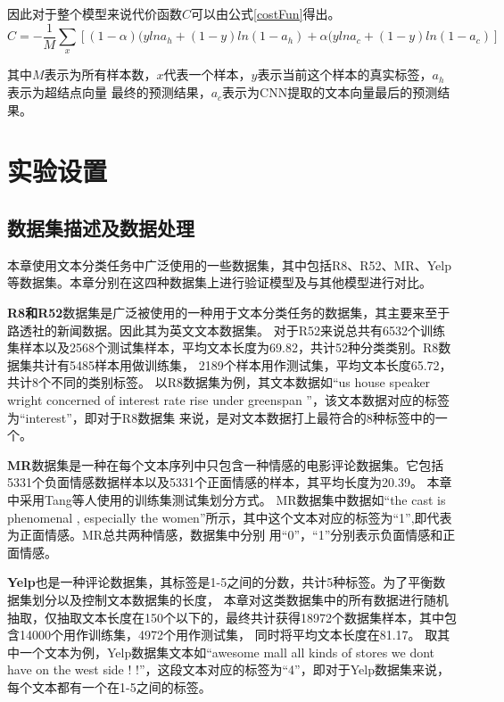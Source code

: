 因此对于整个模型来说代价函数$C$可以由公式\ref{costFun}得出。
\begin{equation}\label{costFun}
    C=-\frac{1}{M}\sum \limits_{x}\left[(1-\alpha)(ylna_h+(1-y)ln(1-a_h)+\alpha(ylna_c+(1-y)ln(1-a_c)\right]
\end{equation}

其中$M$表示为所有样本数，$x$代表一个样本，$y$表示当前这个样本的真实标签，$a_h$表示为超结点向量
最终的预测结果，$a_c$表示为CNN提取的文本向量最后的预测结果。

\section{实验设置}
\subsection{数据集描述及数据处理}
本章使用文本分类任务中广泛使用的一些数据集，其中包括R8、R52、MR、Yelp等数据集。本章分别在这四种数据集上进行验证模型及与其他模型进行对比。

\textbf{R8和R52}数据集是广泛被使用的一种用于文本分类任务的数据集，其主要来至于路透社的新闻数据。因此其为英文文本数据集。
对于R52来说总共有6532个训练集样本以及2568个测试集样本，平均文本长度为69.82，共计52种分类类别。R8数据集共计有5485样本用做训练集，
2189个样本用作测试集，平均文本长度65.72，共计8个不同的类别标签。
以R8数据集为例，其文本数据如“us house speaker wright concerned of interest rate rise under greenspan ”，该文本数据对应的标签为“interest”，即对于R8数据集
来说，是对文本数据打上最符合的8种标签中的一个。

\textbf{MR}数据集是一种在每个文本序列中只包含一种情感的电影评论数据集。它包括5331个负面情感数据样本以及5331个正面情感的样本，其平均长度为20.39。
本章中采用Tang等人使用的训练集测试集划分方式。
MR数据集中数据如“the cast is phenomenal , especially the women”所示，其中这个文本对应的标签为“1”,即代表为正面情感。MR总共两种情感，数据集中分别
用“0”，“1”分别表示负面情感和正面情感。

\textbf{Yelp}也是一种评论数据集，其标签是1-5之间的分数，共计5种标签。为了平衡数据集划分以及控制文本数据集的长度，
本章对这类数据集中的所有数据进行随机抽取，仅抽取文本长度在150个以下的，最终共计获得18972个数据集样本，其中包含14000个用作训练集，4972个用作测试集，
同时将平均文本长度在81.17。
取其中一个文本为例，Yelp数据集文本如“awesome mall all kinds of stores we dont have on the west side ! !”，这段文本对应的标签为“4”，即对于Yelp数据集来说，
每个文本都有一个在1-5之间的标签。

